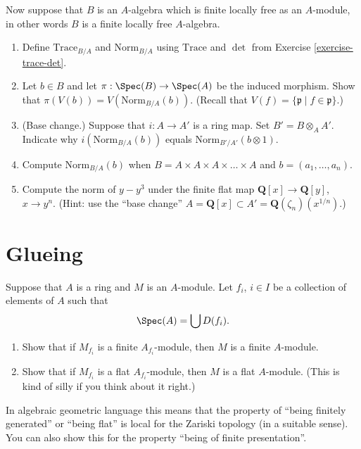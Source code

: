 \begin{exercise}
\label{exercise-trace-det-rings}
Now suppose that $B$ is an $A$-algebra which is finite
locally free as an $A$-module, in other words $B$ is a finite locally
free $A$-algebra.
\begin{enumerate}
\item Define $\text{Trace}_{B/A}$ and $\text{Norm}_{B/A}$ using
$\text{Trace}$ and $\det$ from Exercise \ref{exercise-trace-det}.
\item Let $b\in B$ and let $\pi : \Spec(B) \to \Spec(A)$ be
the induced morphism. Show that $\pi(V(b)) = V(\text{Norm}_{B/A}(b))$.
(Recall that $V(f) = \{ {\mathfrak p} \mid f \in {\mathfrak p}\}$.)
\item (Base change.) Suppose that $i : A \to A'$ is a ring map. Set
$B' = B \otimes_A A'$. Indicate why $i(\text{Norm}_{B/A}(b))$ equals
$\text{Norm}_{B'/A'}(b \otimes 1)$.
\item Compute $\text{Norm}_{B/A}(b)$ when
$B = A \times A \times A \times \ldots \times A$
and $b = (a_1, \ldots, a_n)$.
\item Compute the norm of $y-y^3$ under the finite flat
map ${\mathbf Q}[x] \to {\mathbf Q}[y]$, $x \to y^n$. (Hint: use
the ``base change''
$A = {\mathbf Q}[x] \subset A' = {\mathbf Q}(\zeta_n)(x^{1/n})$.)
\end{enumerate}
\end{exercise}



\section{Glueing}
\label{section-glueing}

\begin{exercise}
\label{exercise-cover}
Suppose that $A$ is a ring and $M$ is an $A$-module.
Let $f_i$, $i \in I$ be a collection of elements of $A$ such that
$$
\Spec(A) = \bigcup D(f_i).
$$
\begin{enumerate}
\item Show that if $M_{f_i}$ is a finite $A_{f_i}$-module,
then $M$ is a finite $A$-module.
\item Show that if $M_{f_i}$ is a flat $A_{f_i}$-module,
then $M$ is a flat $A$-module.
(This is kind of silly if you think about it right.)
\end{enumerate}
\end{exercise}

\begin{remark}
\label{remark-cover}
In algebraic geometric language this means that the property
of ``being finitely generated'' or ``being flat'' is local for the Zariski
topology (in a suitable sense). You can also show this for the property
``being of finite presentation''.
\end{remark}

